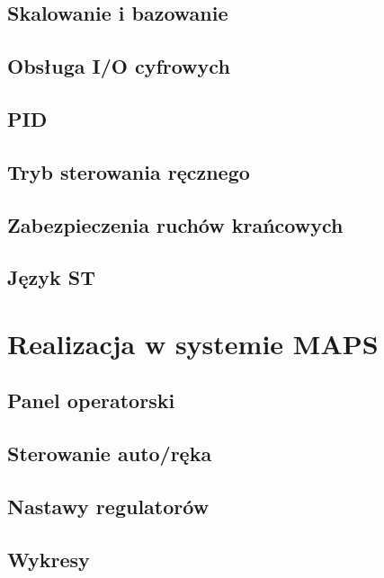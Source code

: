 \documentclass{mwrep}
\begin{document}
\section{Skalowanie i bazowanie}
\label{PLC::Bazowanie}

\section{Obsługa I/O cyfrowych}
\label{PLC::IOCyfrowe}

\section{PID}
\label{PLC::PID}

\section{Tryb sterowania ręcznego}
\label{PLC::Reka}

\section{Zabezpieczenia ruchów krańcowych}
\label{PLC::Krancowki}

\section{Język ST}
\label{PLC::ST}

\chapter{Realizacja w systemie MAPS}
\label{MAPS}

\section{Panel operatorski}
\label{MAPS::PanelOperatorski}

\section{Sterowanie auto/ręka}
\label{MAPS::AutoReka}

\section{Nastawy regulatorów}
\label{MAPS::Nastawy}

\section{Wykresy}
\label{MAPS::Wykresy}
\end{document}
